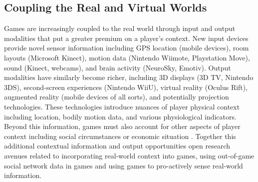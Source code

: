 \documentclass[conference]{IEEEtran}
\newcounter{questionno}
\newcommand{\subsubsectionx}[1]{{\em {\arabic{questionno}) #1}}
	\addtocounter{questionno}{1}
	}
\begin{document}
%


\subsection{Coupling the Real and Virtual Worlds}

Games are increasingly coupled to the real world through input and output modalities that put a greater premium on a player's context. New input devices provide novel sensor information including GPS location (mobile devices), room layouts (Microsoft Kinect), motion data (Nintendo Wiimote, Playstation Move), sound (Kinect, webcams), and brain activity (NeuroSky, Emotiv). 
Output modalities have similarly become richer, including 3D displays (3D TV, Nintendo 3DS), second-screen experiences (Nintendo WiiU), virtual reality (Oculus Rift), augmented reality (mobile devices of all sorts), and potentially projection technologies. 
These technologies introduce nuances of player physical context including location, bodily motion data, and various physiological indicators. 
Beyond this information, games must also account for other aspects of player context including social circumstances or economic situation . Together this additional contextual information and output opportunities open research avenues related to incorporating real-world context into games, using out-of-game social network data in games and using games to pro-actively sense real-world information.
\end{document}
